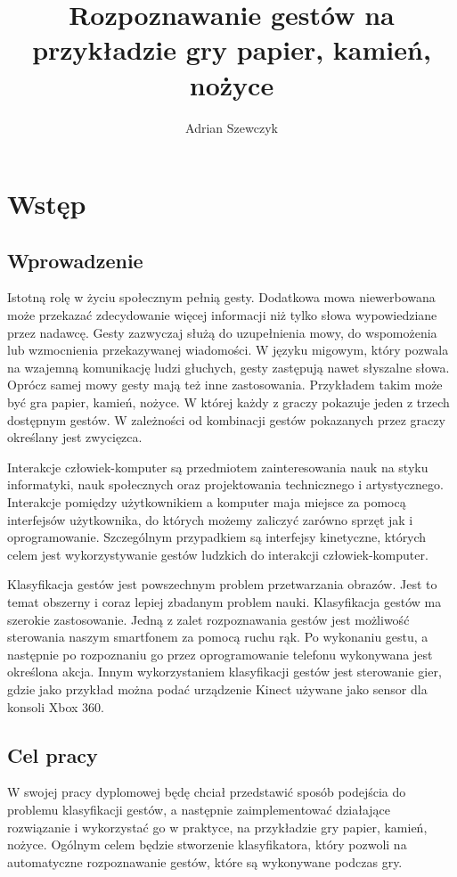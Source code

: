 \documentclass[a4paper,12pt,twoside,openany]{report}
\title{Rozpoznawanie gestów na przykładzie gry papier, kamień, nożyce}
\author{Adrian Szewczyk}
\begin{document}
\maketitle


\chapter{Wstęp}
\section{Wprowadzenie}
Istotną rolę w życiu społecznym pełnią gesty. Dodatkowa mowa niewerbowana może przekazać zdecydowanie więcej informacji niż tylko słowa wypowiedziane przez nadawcę. Gesty zazwyczaj służą do uzupełnienia mowy, do wspomożenia lub wzmocnienia przekazywanej wiadomości\cite{Collins}. W języku migowym, który pozwala na wzajemną komunikację ludzi głuchych, gesty zastępują nawet słyszalne słowa. Oprócz samej mowy gesty mają też inne zastosowania. Przykładem takim może być gra papier, kamień, nożyce. W której każdy z graczy pokazuje jeden z trzech dostępnym gestów. W zależności od kombinacji gestów pokazanych przez graczy określany jest zwycięzca.

Interakcje człowiek-komputer są przedmiotem zainteresowania nauk na styku informatyki, nauk społecznych oraz projektowania technicznego i artystycznego. Interakcje pomiędzy użytkownikiem a komputer maja miejsce za pomocą interfejsów użytkownika, do których możemy zaliczyć zarówno sprzęt jak i oprogramowanie\cite{Kostkiewicz}. Szczególnym przypadkiem są interfejsy kinetyczne, których celem jest wykorzystywanie gestów ludzkich do interakcji człowiek-komputer.

Klasyfikacja gestów jest powszechnym problem przetwarzania obrazów. Jest to temat obszerny i coraz lepiej zbadanym problem nauki. Klasyfikacja gestów ma szerokie zastosowanie. Jedną z zalet rozpoznawania gestów jest możliwość sterowania naszym smartfonem za pomocą ruchu rąk. Po wykonaniu gestu, a następnie po rozpoznaniu go przez  oprogramowanie telefonu wykonywana jest określona akcja. Innym wykorzystaniem klasyfikacji gestów jest sterowanie gier, gdzie jako przykład można podać urządzenie Kinect używane jako sensor dla konsoli Xbox 360\cite{Kinect}.

\section{Cel pracy}
W swojej pracy dyplomowej będę chciał przedstawić sposób podejścia do problemu klasyfikacji gestów, a następnie zaimplementować działające rozwiązanie i wykorzystać go w praktyce, na przykładzie gry papier, kamień, nożyce. Ogólnym celem będzie stworzenie klasyfikatora, który pozwoli na automatyczne rozpoznawanie gestów, które są wykonywane podczas gry.
\end{document}
